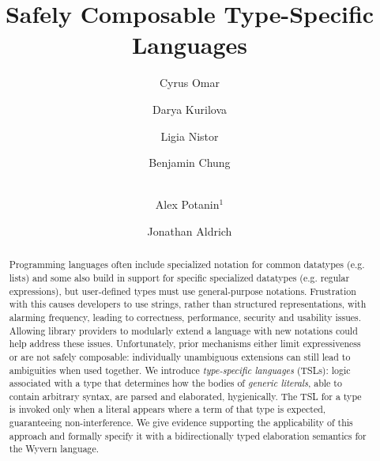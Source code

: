\documentclass[runningheads]{llncs}
\begin{document}
\title{Safely Composable Type-Specific Languages}
\author{Cyrus Omar \and Darya Kurilova \and Ligia Nistor \and Benjamin Chung \and\\
Alex Potanin$^{1}$ \and Jonathan Aldrich}

\maketitle

\begin{abstract}
Programming languages often include specialized notation for common datatypes (e.g. lists) and some also build in support for specific specialized datatypes (e.g. regular expressions), but user-defined types must use general-purpose notations. Frustration with this causes developers to use strings, rather than structured representations, with alarming frequency, leading to correctness, performance, security and usability  issues.
Allowing library providers to modularly extend a language with new notations could help address these issues. Unfortunately, prior mechanisms either limit expressiveness or are not safely composable: individually unambiguous extensions can still lead to ambiguities when used together. We introduce \emph{type-specific languages} (TSLs):  logic associated with a type that determines how the bodies of \emph{generic literals}, able to contain arbitrary syntax, are parsed and elaborated, hygienically. The TSL for a type is invoked only when a literal appears where a term of that type is expected, guaranteeing non-interference. We give evidence supporting the applicability of  this approach and formally specify it with a bidirectionally typed elaboration semantics for the Wyvern language.


\end{abstract}
\end{document}
